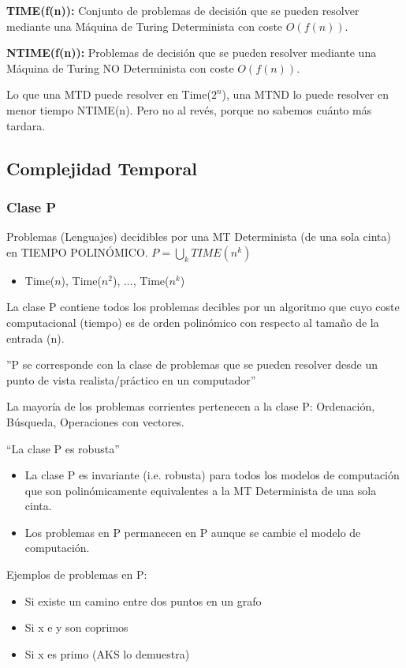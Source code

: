 \textbf{TIME(f(n)):} Conjunto de problemas de decisión que se pueden resolver mediante una Máquina de Turing Determinista con coste $O(f(n))$.

\textbf{NTIME(f(n)):} Problemas de decisión que se pueden resolver mediante una Máquina de Turing NO Determinista con coste $O(f(n))$.

Lo que una MTD puede resolver en Time($2^n$), una MTND  lo puede resolver en menor tiempo NTIME(n). Pero no al revés, porque no sabemos cuánto más tardara. 

\subsection{Complejidad Temporal}
\subsubsection{Clase P}
Problemas (Lenguajes) decidibles por una MT Determinista (de una sola cinta) en TIEMPO POLINÓMICO. $P= \bigcup_k TIME(n^k)$
\begin{itemize}
  \item Time($n$), Time($n^2$), ..., Time($n^k$)
\end{itemize}

La clase P contiene todos los problemas decibles por un algoritmo que cuyo coste computacional (tiempo) es de orden polinómico con respecto al tamaño de la entrada (n).

''P se corresponde con la clase de problemas que se pueden resolver desde un punto de vista realista/práctico en un computador''

La mayoría de los problemas corrientes pertenecen a la clase P: Ordenación, Búsqueda, Operaciones con vectores.

“La clase P es robusta”
\begin{itemize}
  \item La clase P es invariante (i.e. robusta) para todos los modelos de computación que son polinómicamente equivalentes a la MT Determinista de una sola cinta.
  \item Los problemas en P permanecen en P aunque se cambie el modelo de computación.
\end{itemize}

Ejemplos de problemas en P:
\begin{itemize}
  \item Si existe un camino entre dos puntos en un grafo
  \item Si x e y son coprimos
  \item Si x es primo (AKS lo demuestra)
\end{itemize}


